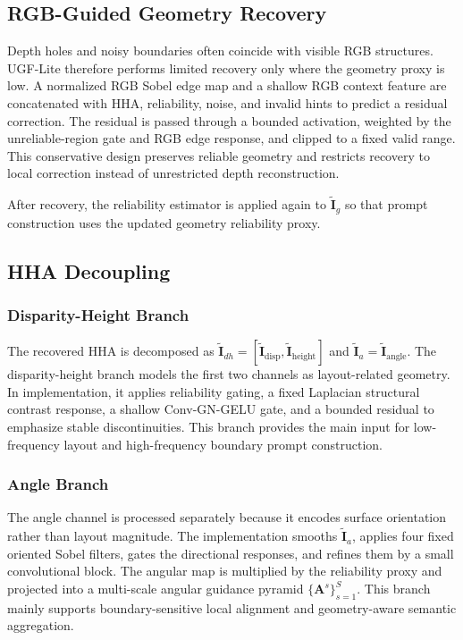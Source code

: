 \documentclass[a4paper,fleqn]{cas-dc}
\begin{document}
\subsection{RGB-Guided Geometry Recovery}

Depth holes and noisy boundaries often coincide with visible RGB structures. UGF-Lite therefore performs limited recovery only where the geometry proxy is low. A normalized RGB Sobel edge map and a shallow RGB context feature are concatenated with HHA, reliability, noise, and invalid hints to predict a residual correction. The residual is passed through a bounded activation, weighted by the unreliable-region gate and RGB edge response, and clipped to a fixed valid range. This conservative design preserves reliable geometry and restricts recovery to local correction instead of unrestricted depth reconstruction.

After recovery, the reliability estimator is applied again to $\tilde{\mathbf{I}}_{g}$ so that prompt construction uses the updated geometry reliability proxy.

\subsection{HHA Decoupling}

\subsubsection{Disparity-Height Branch}

The recovered HHA is decomposed as $\tilde{\mathbf{I}}_{dh}=[\tilde{\mathbf{I}}_{\mathrm{disp}},\tilde{\mathbf{I}}_{\mathrm{height}}]$ and $\tilde{\mathbf{I}}_{a}=\tilde{\mathbf{I}}_{\mathrm{angle}}$. The disparity-height branch models the first two channels as layout-related geometry. In implementation, it applies reliability gating, a fixed Laplacian structural contrast response, a shallow Conv-GN-GELU gate, and a bounded residual to emphasize stable discontinuities. This branch provides the main input for low-frequency layout and high-frequency boundary prompt construction.

\subsubsection{Angle Branch}

The angle channel is processed separately because it encodes surface orientation rather than layout magnitude. The implementation smooths $\tilde{\mathbf{I}}_{a}$, applies four fixed oriented Sobel filters, gates the directional responses, and refines them by a small convolutional block. The angular map is multiplied by the reliability proxy and projected into a multi-scale angular guidance pyramid $\{\mathbf{A}^{s}\}_{s=1}^{S}$. This branch mainly supports boundary-sensitive local alignment and geometry-aware semantic aggregation.
\end{document}
